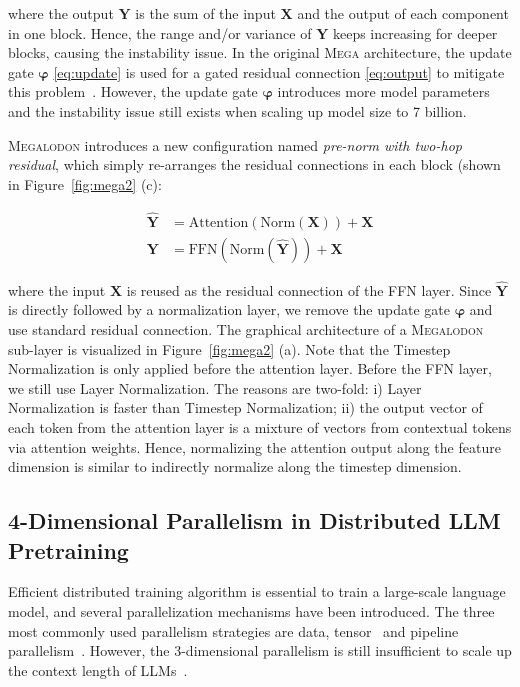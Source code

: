 where the output $\boldsymbol{Y}$ is the sum of the input $\boldsymbol{X}$ and the output of each component in one block. Hence, the range and/or variance of $\boldsymbol{Y}$ keeps increasing for deeper blocks, causing the instability issue. In the original \textsc{Mega} architecture, the update gate $\boldsymbol{\varphi}$ \eqref{eq:update} is used for a gated residual connection \eqref{eq:output} to mitigate this problem~\citep{parisotto2020stabilizing,xu2020transformer}. However, the update gate $\boldsymbol{\varphi}$ introduces more model parameters and the instability issue still exists when scaling up model size to 7 billion.

\textsc{Megalodon} introduces a new configuration named \emph{pre-norm with two-hop residual}, which simply re-arranges the residual connections in each block (shown in Figure~\ref{fig:mega2} (c):

\begin{align}
\hat{\boldsymbol{Y}} & = \mathrm{Attention}(\mathrm{Norm}(\boldsymbol{X})) + \boldsymbol{X} \nonumber \\
\boldsymbol{Y} & = \mathrm{FFN}(\mathrm{Norm}(\hat{\boldsymbol{Y}})) + \boldsymbol{X}
\end{align}

where the input $\boldsymbol{X}$ is reused as the residual connection of the FFN layer. Since $\hat{\boldsymbol{Y}}$ is directly followed by a normalization layer, we remove the update gate $\boldsymbol{\varphi}$ and use standard residual connection. The graphical architecture of a \textsc{Megalodon} sub-layer is visualized in Figure~\ref{fig:mega2} (a). Note that the Timestep Normalization is only applied before the attention layer. Before the FFN layer, we still use Layer Normalization. The reasons are two-fold: i) Layer Normalization is faster than Timestep Normalization; ii) the output vector of each token from the attention layer is a mixture of vectors from contextual tokens via attention weights. Hence, normalizing the attention output along the feature dimension is similar to indirectly normalize along the timestep dimension. 

\subsection{4-Dimensional Parallelism in Distributed LLM Pretraining}
\label{subsec:parallelism}
Efficient distributed training algorithm is essential to train a large-scale language model, and several parallelization mechanisms have been introduced. The three most commonly used parallelism strategies are data, tensor~\citep{shoeybi2019megatron} and pipeline parallelism~\citep{NEURIPS2019_093f65e0}. However, the 3-dimensional parallelism is still insufficient to scale up the context length of LLMs~\citep{li2023lightseq,liu2024ring}.

